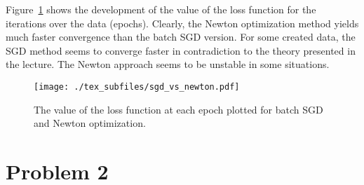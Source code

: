 \documentclass[a4paper]{article}
\begin{document}
Figure~\ref{fig:sgd_vs_newton} shows the development of the value of the loss
function for the iterations over the data (epochs). Clearly, the Newton
optimization method yields much faster convergence than the batch SGD version.
For some created data, the SGD method seems to converge faster in contradiction
to the theory presented in the lecture. The Newton approach seems to be unstable
in some situations.

\begin{figure}[hbt]
    \texttt{[image: ./tex\_subfiles/sgd\_vs\_newton.pdf]}
    \caption{The value of the loss function at each epoch plotted for batch SGD
    and Newton optimization.}\label{fig:sgd_vs_newton}
\end{figure}

\section{Problem 2}
\end{document}
